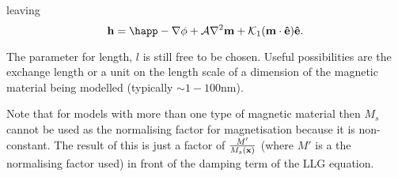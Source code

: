 leaving
\begin{equation}
  \hv = \happ - \nabla \phi + \exchc \nabla^2 \mv + \kone (\mv \cdot \ev) \ev.
\end{equation}

The parameter for length, $l$ is still free to be chosen. Useful possibilities are the exchange length or a unit on the length scale of a dimension of the magnetic material being modelled (typically $\sim1-100$nm).

Note that for models with more than one type of magnetic material then $M_s$ cannot be used as the normalising factor for magnetisation because it is non-constant. The result of this is just a factor of $\frac{M'}{M_s(\mathbf{x})}$ (where $M'$ is a the normalising factor used) in front of the damping term of the LLG equation.








